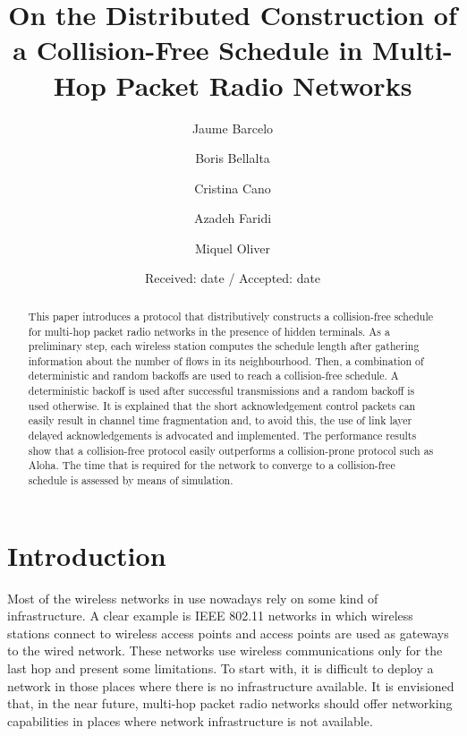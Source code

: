\documentclass[twocolumn]{svjour3}          \smartqed  \usepackage{graphicx}
\begin{document}
\title{On the Distributed Construction of a Collision-Free Schedule in Multi-Hop Packet Radio Networks}



\author{Jaume Barcelo \and
        Boris Bellalta         \and
        Cristina Cano \and
        Azadeh Faridi \and
        Miquel Oliver}




\date{Received: date / Accepted: date}



\maketitle

\begin{abstract}
This paper introduces a protocol that distributively constructs a collision-free schedule for multi-hop packet radio networks in the presence of hidden terminals.
As a preliminary step, each wireless station computes the schedule length after gathering information about the number of flows in its neighbourhood.
Then, a combination of deterministic and random backoffs are used to reach a collision-free schedule.
A deterministic backoff is used after successful transmissions and a random backoff is used otherwise.
It is explained that the short acknowledgement control packets can easily result in channel time fragmentation and, to avoid this, the use of link layer delayed acknowledgements is advocated and implemented.
The performance results show that a collision-free protocol easily outperforms a collision-prone protocol such as Aloha.
The time that is required for the network to converge to a collision-free schedule is assessed by means of simulation.
\end{abstract}

\section{Introduction}
\label{intro}
Most of the wireless networks in use nowadays rely on some kind of infrastructure.
A clear example is IEEE 802.11 networks in which wireless stations connect to wireless access points and access points are used as gateways to the wired network.
These networks use wireless communications only for the last hop and present some limitations.
To start with, it is difficult to deploy a network in those places where there is no infrastructure available.
It is envisioned that, in the near future, multi-hop packet radio networks should offer networking capabilities in places where network infrastructure is not available.
\end{document}
